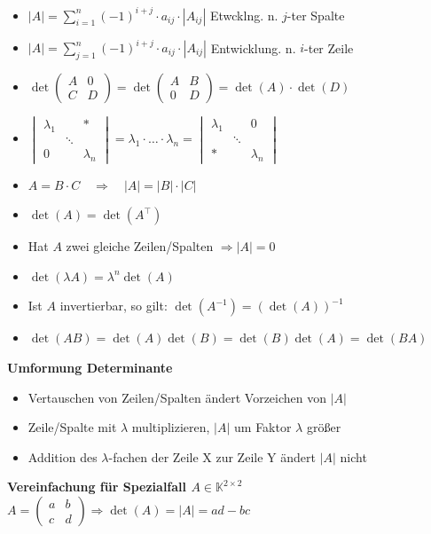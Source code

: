 \documentclass[6pt,a4paper]{scrartcl}
\begin{document}
\begin{multicols*}{4}
\begin{itemize}\itemsep0pt
\item $|A|=\sum\limits_{i=1}^n (-1)^{i+j} \cdot a_{ij} \cdot |A_{ij}|$ \qquad Etwcklng. n. $j$-ter Spalte
\item $|A|=\sum\limits_{j=1}^n (-1)^{i+j} \cdot a_{ij} \cdot |A_{ij}|$ \qquad Entwicklung. n. $i$-ter Zeile
\item $\det\begin{pmatrix}A&0\\C&D\end{pmatrix}=\det\begin{pmatrix}A&B\\0&D\end{pmatrix}=\det(A)\cdot\det(D)$
\item $\begin{vmatrix}\lambda_1&&* \\ &\ddots& \\ 0&&\lambda_n \end{vmatrix} = \lambda_1\cdot \ldots\cdot \lambda_n = \begin{vmatrix} \lambda_1&&0  \\  &\ddots& \\  *&&\lambda_n \end{vmatrix}$
\item $A=B \cdot C \quad \Rightarrow \quad |A|=|B| \cdot |C|$
\item $\det(A)=\det(A^\top)$
\item Hat $A$ zwei gleiche Zeilen/Spalten $\Rightarrow |A|=0$
\item $\det(\lambda A)=\lambda^n \det(A)$
\item Ist $A$ invertierbar, so gilt: $\det(A^{-1})=(\det(A))^{-1}$
\item $\det(AB) = \det(A) \det(B) = \det(B) \det(A) = \det(BA)$
\end{itemize}
\textbf{Umformung Determinante}
\begin{itemize}\itemsep0pt
\item Vertauschen von Zeilen/Spalten ändert Vorzeichen von $|A|$
\item Zeile/Spalte mit $\lambda$ multiplizieren, $|A|$ um Faktor $\lambda$ größer
\item Addition des $\lambda$-fachen der Zeile X zur Zeile Y ändert $|A|$ nicht 
\end{itemize}
\textbf{Vereinfachung für Spezialfall $A\in \mathbb K^{2\times 2}$}\\
$A=\begin{pmatrix}a&b\\c&d\end{pmatrix} \Rightarrow \det(A)=|A|=ad-bc$


\end{multicols*}
\end{document}
